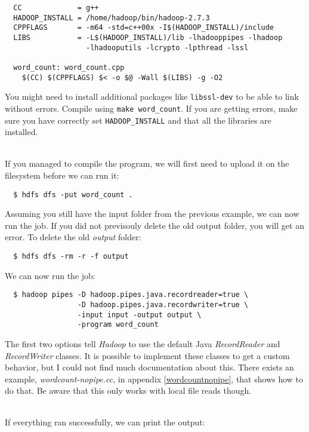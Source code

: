 \documentclass[a4paper, 12pt]{article}
\begin{document}
\begin{verbatim}
  CC             = g++
  HADOOP_INSTALL = /home/hadoop/bin/hadoop-2.7.3
  CPPFLAGS       = -m64 -std=c++00x -I$(HADOOP_INSTALL)/include
  LIBS           = -L$(HADOOP_INSTALL)/lib -lhadooppipes -lhadoop
                   -lhadooputils -lcrypto -lpthread -lssl

  word_count: word_count.cpp
    $(CC) $(CPPFLAGS) $< -o $@ -Wall $(LIBS) -g -O2
\end{verbatim}

You might need to install additional packages like \texttt{libssl-dev} to be able to link without errors. Compile using \texttt{make word\_count}. If you are getting errors, make sure you have correctly set \texttt{HADOOP\_INSTALL} and that all the libraries are installed.

~\\
If you managed to compile the program, we will first need to upload it on the filesystem before we can run it:

\begin{verbatim}
  $ hdfs dfs -put word_count .
\end{verbatim}

Assuming you still have the input folder from the previous example, we can now run the job. If you did not previsouly delete the old output folder, you will get an error. To delete the old \textit{output} folder:

\begin{verbatim}
  $ hdfs dfs -rm -r -f output
\end{verbatim}

We can now run the job:

\begin{verbatim}
  $ hadoop pipes -D hadoop.pipes.java.recordreader=true \
                 -D hadoop.pipes.java.recordwriter=true \
                 -input input -output output \
                 -program word_count
\end{verbatim}

The first two options tell \textit{Hadoop} to use the default Java \textit{RecordReader} and \textit{RecordWriter} classes. It is possible to implement these classes to get a custom behavior, but I could not find much documentation about this. There exists an example, \textit{wordcount-nopipe.cc}, in appendix \ref{wordcountnopipe}, that shows how to do that. Be aware that this only works with local file reads though.

~\\
If everything ran successfully, we can print the output:
\end{document}

